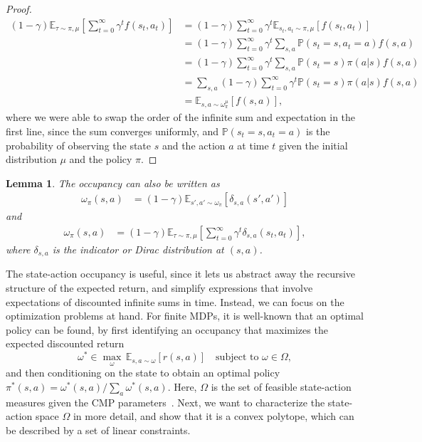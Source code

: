 \documentclass{article}
\theoremstyle{plain}
\newtheorem{lemma}[theorem]{Lemma}
\theoremstyle{definition}
\theoremstyle{remark}
\begin{document}
\begin{proof}
    \begin{align}
        (1-\gamma)\mathbb{E}_{\tau \sim \pi,\mu} \left[ \sum_{t=0}^\infty \gamma^t f(s_t, a_t) \right] &= (1-\gamma)\sum_{t=0}^\infty \gamma^t \mathbb{E}_{s_t, a_t \sim \pi,\mu} [f(s_t, a_t)]\\
        &= (1-\gamma)\sum_{t=0}^\infty \gamma^t \sum_{s,a}\mathbb{P}(s_t=s,a_t=a) f(s, a)\\
        &= (1-\gamma)\sum_{t=0}^\infty \gamma^t \sum_{s,a}\mathbb{P}(s_t=s)\pi(a|s) f(s, a)\\
        &= \sum_{s,a}(1-\gamma)\sum_{t=0}^\infty \gamma^t \mathbb{P}(s_t=s)\pi(a|s) f(s, a)\\
        &= \mathbb{E}_{s, a \sim \omega^\mu_\pi} [f(s, a)],
    \end{align}
where we were able to swap the order of the infinite sum and expectation in the first line, since the sum converges uniformly, and $\mathbb{P}(s_t=s,a_t=a)$ is the probability of observing the state $s$ and the action $a$ at time $t$ given the initial distribution $\mu$ and the policy $\pi$.
\end{proof}

\begin{lemma}
The occupancy can also be written as 
\begin{align}
   \omega_\pi(s,a) &= (1-\gamma)\mathbb{E}_{s',a' \sim \omega_\pi} \left[ \delta_{s,a}(s', a') \right]
\end{align}
and
\begin{align}
   \omega_\pi(s,a) &= (1-\gamma)\mathbb{E}_{\tau \sim \pi,\mu} \left[ \sum_{t=0}^\infty \gamma^t \delta_{s,a}(s_t, a_t) \right],
\end{align}
where $\delta_{s,a}$ is the indicator or Dirac distribution at $(s,a)$.
\end{lemma}

The state-action occupancy is useful, since it lets us abstract away the recursive structure of the expected return, and simplify expressions that involve expectations of discounted infinite sums in time. Instead, we can focus on the optimization problems at hand. For finite MDPs, it is well-known that an optimal policy can be found, by first identifying an occupancy that maximizes the expected discounted return
\begin{equation}\label{eq:lin-program}
    \omega^* \in \max_\omega\, \mathbb{E}_{s,a\sim \omega}[r(s,a)]
    \quad \text{subject to } \omega \in\Omega,
\end{equation}
and then conditioning on the state to obtain an optimal policy $\pi^*(s,a) = \omega^*(s,a)/\sum_{a}\omega^*(s,a)$.
Here, $\Omega$ is the set of feasible state-action measures given the CMP parameters~\citep{feinberg2012handbook}.
Next, we want to characterize the state-action space $\Omega$ in more detail, and show that it is a convex polytope, which can be described by a set of linear constraints.
\end{document}
